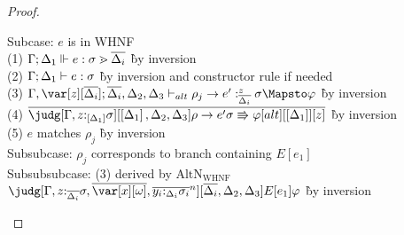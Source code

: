    \begin{proof}
   ~  
     \begin{tabbing}
       Subcase: $e$ is in WHNF\\
       (1) $\Gamma;\Delta_1 \Vdash e:\sigma \gtrdot \overline{\Delta_i}$ \` by inversion\\
       (2) $\Gamma ; \Delta_1 \vdash e : \sigma$ \` by inversion and constructor rule
       if needed\\
       (3) $\G,\var[z][\ov{\D_i}];\ov{\D_i},\D_2,\D_3 \vdash_{alt} \rho_j
       \to e' :^z_{\ov{\D_i}} \s \Mapsto \vp$ \` by inversion\\
       (4) $\ov{\judg[\G,z{:}_{\irr{\D_1}}\s][\irr{\D_1},\D_2,\D_3]{\rho\to e'}{\s
           \Rrightarrow \vp}[alt][\irr{\D_1}][z]}$ \` by inversion\\
       (5) $e$ matches $\rho_j$ \` by inversion\\
       Subsubcase: $\rho_j$ corresponds to branch containing $E[e_1]$\\
       Subsubsubcase: (3) derived by $\textrm{AltN}_{\textrm{WHNF}}$\\
       $\judg[\G, z{:}_{\ov{\Delta_i}} \sigma,\ov{\xo},\ov{y_i{:}_{\D_i}\s_i}^n][\ov{\D_i},\D_2,\D_3]{E[e_1]}{\vp}$
       \` by inversion\\
       

\end{tabbing}
\end{proof}
